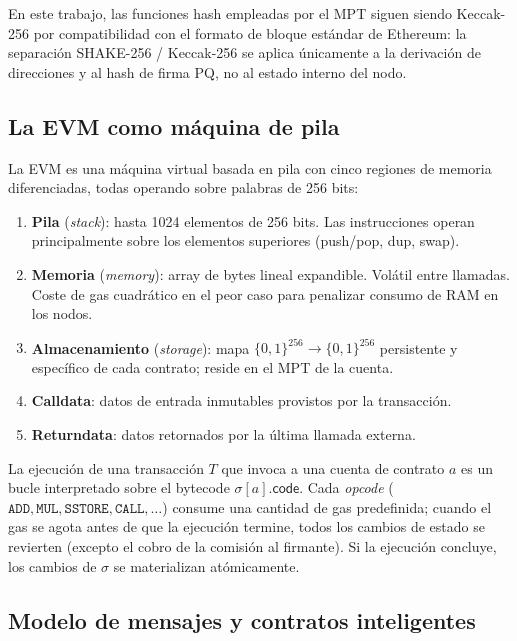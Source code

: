 En este trabajo, las funciones hash empleadas por el MPT siguen siendo Keccak-256 por compatibilidad con el formato de bloque estándar de Ethereum: la separación SHAKE-256 / Keccak-256 se aplica únicamente a la derivación de direcciones y al hash de firma PQ, no al estado interno del nodo.

\subsection{La EVM como máquina de pila}
\label{sec:evm_arch}

La EVM es una máquina virtual basada en pila con cinco regiones de memoria diferenciadas, todas operando sobre palabras de 256 bits:

\begin{enumerate}
  \item \textbf{Pila} (\emph{stack}): hasta 1024 elementos de 256 bits. Las instrucciones operan principalmente sobre los elementos superiores (push/pop, dup, swap).
  \item \textbf{Memoria} (\emph{memory}): array de bytes lineal expandible. Volátil entre llamadas. Coste de gas cuadrático en el peor caso para penalizar consumo de RAM en los nodos.
  \item \textbf{Almacenamiento} (\emph{storage}): mapa $\{0,1\}^{256} \to \{0,1\}^{256}$ persistente y específico de cada contrato; reside en el MPT de la cuenta.
  \item \textbf{Calldata}: datos de entrada inmutables provistos por la transacción.
  \item \textbf{Returndata}: datos retornados por la última llamada externa.
\end{enumerate}

La ejecución de una transacción $T$ que invoca a una cuenta de contrato $a$ es un bucle interpretado sobre el bytecode $\sigma[a].\textsf{code}$. Cada \emph{opcode} ($\texttt{ADD}, \texttt{MUL}, \texttt{SSTORE}, \texttt{CALL}, \ldots$) consume una cantidad de gas predefinida; cuando el gas se agota antes de que la ejecución termine, todos los cambios de estado se revierten (excepto el cobro de la comisión al firmante). Si la ejecución concluye, los cambios de $\sigma$ se materializan atómicamente.

\subsection{Modelo de mensajes y contratos inteligentes}
\label{sec:smart_contracts}

